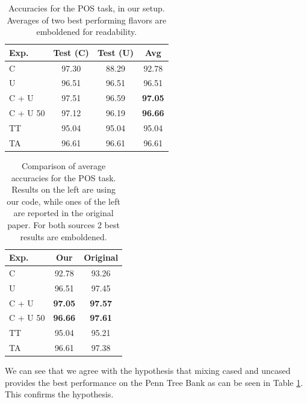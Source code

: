 \documentclass[11pt,a4paper]{article}
\begin{document}
    \begin{table}[h]
        \centering
        \begin{tabular}{|l|c|c|c|}
            \hline
            Exp. & Test (C) & Test (U) & Avg \\
            \hline
            C        & 97.30 & 88.29 & 92.78 \\
            U        & 96.51 & 96.51 & 96.51 \\
            C + U    & 97.51 & 96.59 & \textbf{97.05} \\
            C + U 50 & 97.12 & 96.19 & \textbf{96.66} \\
            TT       & 95.04 & 95.04 & 95.04 \\
            TA       & 96.61 & 96.61 & 96.61 \\
            \hline
        \end{tabular}
        \caption{Accuracies for the POS task, in our setup. Averages of two best performing flavors are emboldened for readability.}
        \label{tab:pos-results-our}
    \end{table}

    \begin{table}[h]
        \centering
        \begin{tabular}{|l|c|c|}
            \hline
            Exp. & Our & Original \\
            \hline
            C        & 92.78 & 93.26 \\
            U        & 96.51 & 97.45 \\
            C + U    & \textbf{97.05} & \textbf{97.57} \\
            C + U 50 & \textbf{96.66} & \textbf{97.61} \\
            TT       & 95.04 & 95.21 \\
            TA       & 96.61 & 97.38 \\
            \hline
        \end{tabular}
        \caption{Comparison of average accuracies for the POS task. Results on the left are using our code, while ones of the left are reported in the original paper. For both sources 2 best results are emboldened.}
        \label{tab:pos-results-comp}
    \end{table}

    We can see that we agree with the hypothesis that mixing cased and uncased provides the best performance on the Penn Tree Bank as can be seen in Table \ref{tab:pos-results-our}. This confirms the hypothesis.
\end{document}
